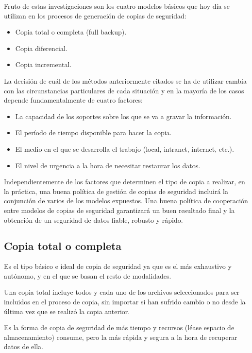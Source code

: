 \documentclass[12pt]{article}
\begin{document}
Fruto de estas investigaciones son los cuatro modelos básicos que hoy 
día se utilizan en los procesos de generación de copias de seguridad:
\begin{itemize}
\item Copia total o completa (full backup).
\item Copia diferencial.
\item Copia incremental.
\end{itemize}

La decisión de cuál de los métodos anteriormente citados se ha de 
utilizar cambia con las circunstancias particulares de cada situación 
y en la mayoría de los casos depende fundamentalmente de cuatro factores:

\begin{itemize}
\item La capacidad de los soportes sobre los que se va a gravar la 
información.
\item El período de tiempo disponible para hacer la copia.
\item El medio en el que se desarrolla el trabajo (local, intranet, 
internet, etc.).
\item El nivel de urgencia a la hora de necesitar restaurar los datos.
\end{itemize}

Independientemente de los factores que determinen el tipo de copia a 
realizar, en la práctica, una buena política de gestión de copias de 
seguridad incluirá la conjunción de varios de los modelos expuestos. Una 
buena política de cooperación entre modelos de copias de seguridad 
garantizará un buen resultado final y la obtención de un seguridad
de datos fiable, robusto y rápido.

\subsection*{Copia total o completa}
Es el tipo básico e ideal de copia de seguridad ya que es el más 
exhaustivo y autónomo, y en el que se basan el resto de modalidades.

Una copia total incluye todos y cada uno de los archivos seleccionados
para ser incluidos en el proceso de copia, sin importar si han 
sufrido cambio o no desde la última vez que se realizó la copia anterior.

Es la forma de copia de seguridad de más tiempo y recursos (léase espacio 
de almacenamiento) consume, pero la más rápida y segura a la hora de 
recuperar datos de ella. 
\end{document}
